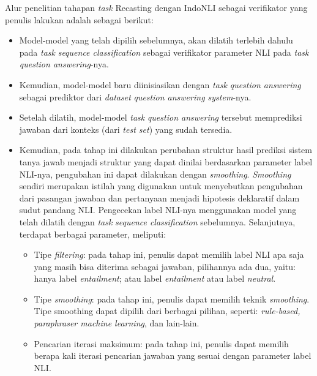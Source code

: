Alur penelitian tahapan \emph{task} Recasting dengan IndoNLI sebagai verifikator yang penulis lakukan adalah sebagai berikut:

\begin{itemize}
    
    \item Model-model yang telah dipilih sebelumnya, akan dilatih terlebih dahulu pada \emph{task} \emph{sequence classification} sebagai verifikator parameter NLI pada \emph{task} \emph{question answering}-nya.

    \item Kemudian, model-model baru diinisiasikan dengan \emph{task} \emph{question answering} sebagai prediktor dari \emph{dataset} \emph{question answering system}-nya.
    
    \item Setelah dilatih, model-model \emph{task} \emph{question answering} tersebut memprediksi jawaban dari konteks (dari \emph{test set}) yang sudah tersedia.
    
    \item Kemudian, pada tahap ini dilakukan perubahan struktur hasil prediksi sistem tanya jawab menjadi struktur yang dapat dinilai berdasarkan parameter label NLI-nya, pengubahan ini dapat dilakukan dengan \emph{smoothing}. \emph{Smoothing} sendiri merupakan istilah yang digunakan untuk menyebutkan pengubahan dari pasangan jawaban dan pertanyaan menjadi hipotesis deklaratif dalam sudut pandang NLI. Pengecekan label NLI-nya menggunakan model yang telah dilatih dengan \emph{task} \emph{sequence classification} sebelumnya. Selanjutnya, terdapat berbagai parameter, meliputi:
    
    \begin{itemize}
        
        \item Tipe \emph{filtering}: pada tahap ini, penulis dapat memilih label NLI apa saja yang masih bisa diterima sebagai jawaban, pilihannya ada dua, yaitu: hanya label \emph{entailment}; atau label \emph{entailment} atau label \emph{neutral}.
        
        \item Tipe \emph{smoothing}: pada tahap ini, penulis dapat memilih teknik \emph{smoothing}. Tipe smoothing dapat dipilih dari berbagai pilihan, seperti: \emph{rule-based, paraphraser machine learning}, dan lain-lain.
        
        \item Pencarian iterasi maksimum: pada tahap ini, penulis dapat memilih berapa kali iterasi pencarian jawaban yang sesuai dengan parameter label NLI.


\end{itemize}
\end{itemize}
